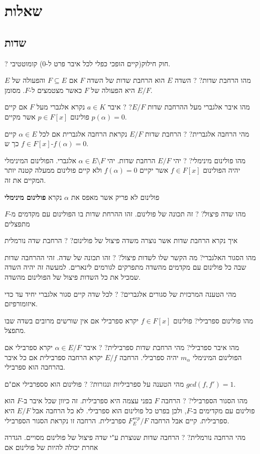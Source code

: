 \documentclass{tstextbook}
\begin{document}
\chapter{שאלות}

\section{שדות}

?
חוק חילוק(קיים הופכי כפלי לכל איבר פרט ל-0) קומוטטיבי.

מהו הרחבת שדות?
?
השדה \(E\) הוא הרחבת שדות של השדה \(F\) אם \(F\subseteq E\) והפעולה של \(E\) היא הפעולה של \(F\) כאשר מצטמצים ל-\(F\). מסומן \(E / F\).

מהו איבר אלגברי מעל ההרחבת שדות \(E / F\)?
?
איבר \(a \in K\) נקרא אלגברי מעל \(F\) אם קיים פולינום \(p \in F[x]\) אשר מקיים \(p\left( \alpha \right)=0\).

מהי הרחבה אלגברית?
?
הרחבת שדות \(E / F\) נקראת הרחבה אלגברית אם לכל \(\alpha \in E\) קיים \(f \in F[x]\) כך ש-\(f\left( \alpha \right)=0\).

מהו פולינום מינימלי?
?
יהי \(E / F\) הרחבת שדות. יהי \(\alpha \in E\setminus F\) אלגברי. הפולינום המינימלי יהיה הפולינום \(f \in F[x]\) אשר יקיים \(f\left( \alpha \right)=0\) ולא קיים פולינום ממעלה קטנה יותר המקיים את זה.

פולינום לא פריק אשר מאפס את \(\alpha\) נקרא \textbf{פולינום מינימלי}

מהו שדה פיצול?
?
זה תכונה של פולינום. זהו ההרחת שדות בו הפולינום עם מקדמים מ-\(F\) מתפצלים

איך נקרא הרחבת שדות אשר נוצרה משדה פיצול של פולינום?
?
הרחבת שדה נורמלית

מהו הסגור האלגברי? מה הקשר שלו לשדות פיצול?
?
זהו תכונה של שדה. זהי ההרחבה שדות שבה כל פולינום עם מקדמים מהשדה מתפרקים לגורמים לינארים. למעשה זה יהיה השדה שמכיל את כל השדות פיצול של הפולינום מהשדה.

מהי הטענה המרכזית של סגורים אלגברים?
?
לכל שדה קיים סגור אלגברי יחיד עד כדי איזומורפיזם.

מהו פולינום ספרבילי?
פולינום \(f \in F[x]\) יקרא ספרבילי אם אין שורשים מרובים בשדה שבו מתפצל.

מהו איבר ספרבילי? מהי הרחבת שדות ספרבילית?
?
איבר \(\alpha \in E / F\) יקרא ספרבילי אם הפולינום המינימלי \(m_{\alpha}\) יהיה ספרבילי.
הרחבה \(E / f\) יקרא הרחבה ספרבילית אם כל איבר בהרחבה הוא ספרבילי.

מהי הטענה על ספרביליות ונגזרות?
?
פולינום הוא סספרבילי אם"ם \(gcd(f,f')=1\).

מהו הסגור הספרבילי?
?
הרחבה \(F\) בפני עצמה היא ספרבילית. זה כיוון שכל איבר ב-\(F\) הוא פולינום עם מקדימים ב-\(F\), ולכן בפרט כל פולינום הוא ספרבילי.
לא כל הרחבה אבל \(E / F\) היא ספרבילית. קיים אבל הרחבה \(F^{sep}_{E} / F\) ספרבילית. הרחבה זו נקראת הסגור הספרבילי.

מהי הרחבה נורמלית?
?
הרחבה שדות שנוצרת ע"י שדה פיצול של פולינום מסויים. הגדרה אחרת יכולה להיות של פולינום אם
\end{document}
